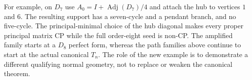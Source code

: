 For example, on $D_7$ use $A_0=I+\operatorname{Adj}(D_7)/4$ and attach the hub to vertices $1$ and $6$. The resulting support has a seven-cycle and a pendant branch, and no five-cycle. The principal-minimal choice of the hub diagonal makes every proper principal matrix CP while the full order-eight seed is non-CP. The amplified family starts at a $D_8$ perfect form, whereas the path families above continue to start at the actual canonical $T_n$. The role of the new example is to demonstrate a different qualifying normal geometry, not to replace or weaken the canonical theorem.
